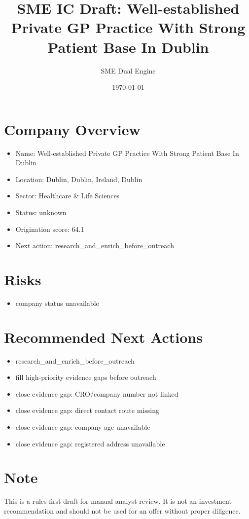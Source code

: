 \documentclass[11pt,a4paper]{article}
\title{SME IC Draft: Well-established Private GP Practice With Strong Patient Base In Dublin}
\author{SME Dual Engine}
\date{\today}
\begin{document}
\maketitle
\section*{Company Overview}
\begin{itemize}[leftmargin=1.4em]
\item Name: Well-established Private GP Practice With Strong Patient Base In Dublin
\item Location: Dublin, Dublin, Ireland, Dublin
\item Sector: Healthcare \& Life Sciences
\item Status: unknown
\item Origination score: 64.1
\item Next action: research\_and\_enrich\_before\_outreach
\end{itemize}
\section*{Risks}
\begin{itemize}[leftmargin=1.4em]
\item company status unavailable
\end{itemize}
\section*{Recommended Next Actions}
\begin{itemize}[leftmargin=1.4em]
\item research\_and\_enrich\_before\_outreach
\item fill high-priority evidence gaps before outreach
\item close evidence gap: CRO/company number not linked
\item close evidence gap: direct contact route missing
\item close evidence gap: company age unavailable
\item close evidence gap: registered address unavailable
\end{itemize}
\section*{Note}
This is a rules-first draft for manual analyst review. It is not an investment
recommendation and should not be used for an offer without proper diligence.
\end{document}

